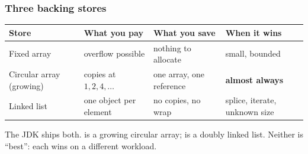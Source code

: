 \documentclass[aspectratio=169,10pt,compress]{beamer}
\begin{document}
\begin{frame}[t,fragile] \frametitle{Three backing stores}
  \begin{center}\small
  \begin{tabular}{L{0.20\textwidth}L{0.22\textwidth}L{0.24\textwidth}L{0.24\textwidth}}
    \toprule
    \textbf{Store}  & \textbf{What you pay} & \textbf{What you save} & \textbf{When it wins} \\
    \midrule
    Fixed array     & overflow possible      & nothing to allocate    & small, bounded \\
    Circular array (growing) & copies at $1,2,4,\dots$ & one array, one reference & \textbf{almost always} \\
    Linked list     & one object per element & no copies, no wrap      & splice, iterate, unknown size \\
    \bottomrule
  \end{tabular}
  \end{center}
  \vspace{0.4em}
  \small
  The JDK ships both.  is a growing circular array;
   is a doubly linked list. Neither is ``best'':
  each wins on a different workload.
\end{frame}
\end{document}
